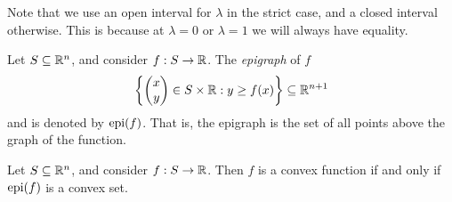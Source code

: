 \begin{rmk}
    Note that we use an open interval for $\lambda$ in the strict case, and a closed interval otherwise. This is because at $\lambda = 0$ or $\lambda = 1$ we will always have equality.
\end{rmk}

\begin{defn}
    Let $S \subseteq \mathbb{R}^n$, and consider $f: S \to \mathbb{R}$. The \emph{epigraph} of $f$
    \begin{align*}
        \left\{\begin{pmatrix}
            x \\ y
        \end{pmatrix} \in S \times \mathbb{R} : y \geq f(x)\right\} \subseteq \mathbb{R}^{n+1}
    \end{align*}
    and is denoted by $\operatorname{epi}(f)$. That is, the epigraph is the set of all points above the graph of the function.
\end{defn}

\begin{prop}\label{epigraph-convexity}
    Let $S \subseteq \mathbb{R}^n$, and consider $f: S \to \mathbb{R}$. Then $f$ is a convex function if and only if $\operatorname{epi}(f)$ is a convex set.
\end{prop}

